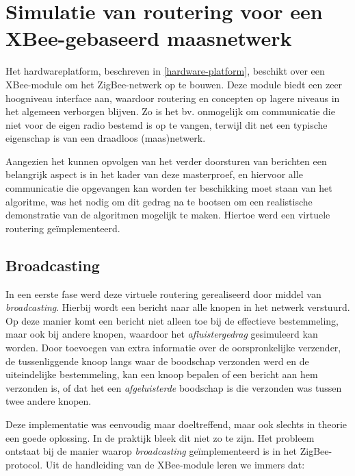 
\chapter{Simulatie van routering voor een XBee-gebaseerd maasnetwerk}
\label{virtual-mesh}

Het hardwareplatform, beschreven in \ref{hardware-platform}, beschikt over een
XBee-module om het ZigBee-netwerk op te bouwen. Deze module biedt een zeer
hoogniveau interface aan, waardoor routering en concepten op lagere niveaus in
het algemeen verborgen blijven. Zo is het bv. onmogelijk om communicatie die
niet voor de eigen radio bestemd is op te vangen, terwijl dit net een typische
eigenschap is van een draadloos (maas)netwerk.

Aangezien het kunnen opvolgen van het verder doorsturen van berichten een
belangrijk aspect is in het kader van deze masterproef, en hiervoor alle
communicatie die opgevangen kan worden ter beschikking moet staan van het
algoritme, was het nodig om dit gedrag na te bootsen om een realistische
demonstratie van de algoritmen mogelijk te maken. Hiertoe werd een virtuele
routering ge\"implementeerd.

\section{Broadcasting}
\label{zigbee-broadcasting}

In een eerste fase werd deze virtuele routering gerealiseerd door middel van
\emph{broadcasting}. Hierbij wordt een bericht naar alle knopen in het netwerk
verstuurd. Op deze manier komt een bericht niet alleen toe bij de effectieve
bestemmeling, maar ook bij andere knopen, waardoor het \emph{afluistergedrag}
gesimuleerd kan worden. Door toevoegen van extra informatie over de
oorspronkelijke verzender, de tussenliggende knoop langs waar de boodschap
verzonden werd en de uiteindelijke bestemmeling, kan een knoop bepalen of een
bericht aan hem verzonden is, of dat het een \emph{afgeluisterde} boodschap is
die verzonden was tussen twee andere knopen. 

Deze implementatie was eenvoudig maar doeltreffend, maar ook slechts in theorie
een goede oplossing. In de praktijk bleek dit niet zo te zijn. Het probleem
ontstaat bij de manier waarop \emph{broadcasting} ge\"implementeerd is in het
ZigBee-protocol. Uit de handleiding van de XBee-module \citep{manual:xbee}
leren we immers dat:

